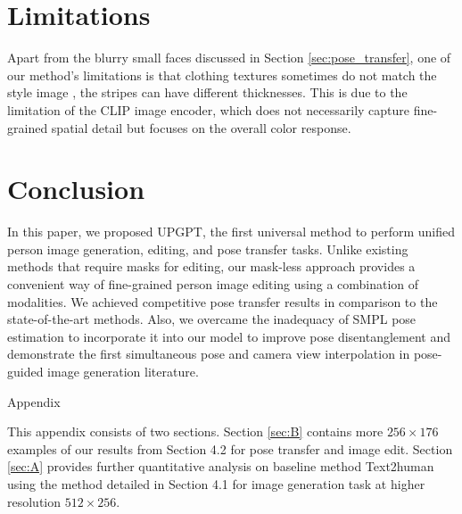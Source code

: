 \documentclass[10pt,twocolumn,letterpaper]{article}
\begin{document}
\section{Limitations}
Apart from the blurry small faces discussed in Section \ref{sec:pose_transfer}, one of our method's limitations is that clothing textures sometimes do not match the style image \eg, the stripes can have different thicknesses. This is due to the limitation of the CLIP image encoder, which does not necessarily capture fine-grained spatial detail but focuses on the overall color response. 


\section{Conclusion}
In this paper, we proposed UPGPT, the first universal method to perform unified person image generation, editing, and pose transfer tasks. Unlike existing methods that require masks for editing, our mask-less approach provides a convenient way of fine-grained person image editing using a combination of modalities. We achieved competitive pose transfer results in comparison to the state-of-the-art methods. Also, we overcame the inadequacy of SMPL pose estimation to incorporate it into our model to improve pose disentanglement and demonstrate the first simultaneous pose and camera view interpolation in pose-guided image generation literature.

\clearpage
{\small


}

\clearpage
\renewcommand\thesection{\Alph{section}}
\renewcommand\thefigure{\thesection.\arabic{figure}}
\setcounter{section}{0} 
\setcounter{figure}{0} 
\onecolumn
\begin{center}
    {\huge Appendix}
\end{center}
This appendix consists of two sections. Section \ref{sec:B} contains more $256\times176$ examples of our results from Section 4.2 for pose transfer and image edit. Section \ref{sec:A} provides further quantitative analysis on baseline method Text2human using the method detailed in Section 4.1 for image generation task at higher resolution $512\times256$. 
\end{document}
